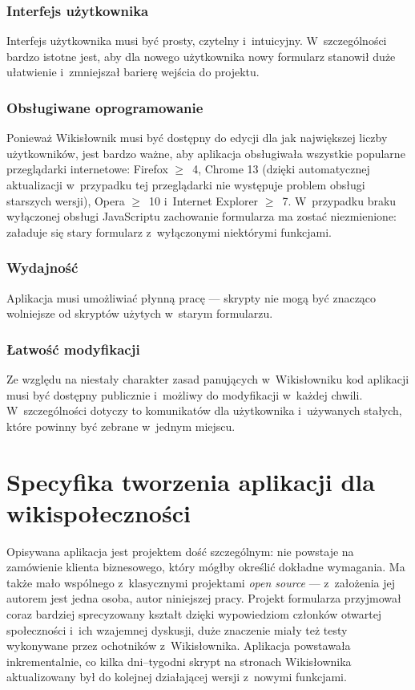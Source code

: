 \subsubsection{Interfejs użytkownika}
Interfejs użytkownika musi być prosty, czytelny i~intuicyjny. W~szczególności bardzo istotne jest, aby dla nowego użytkownika nowy formularz stanowił duże ułatwienie i~zmniejszał barierę wejścia do projektu.

\subsubsection{Obsługiwane oprogramowanie}
Ponieważ Wikisłownik musi być dostępny do edycji dla jak największej liczby użytkowników, jest bardzo ważne, aby aplikacja obsługiwała wszystkie popularne przeglądarki internetowe: Firefox $\geq$~4, Chrome 13 (dzięki automatycznej aktualizacji w~przypadku tej przeglądarki nie występuje problem obsługi starszych wersji), Opera $\geq$~10 i~Internet Explorer $\geq$~7. W~przypadku braku wyłączonej obsługi JavaScriptu zachowanie formularza ma zostać niezmienione: załaduje się stary formularz z~wyłączonymi niektórymi funkcjami.

\subsubsection{Wydajność}
Aplikacja musi umożliwiać płynną pracę --- skrypty nie mogą być znacząco wolniejsze od skryptów użytych w~starym formularzu.

\subsubsection{Łatwość modyfikacji}
Ze względu na niestały charakter zasad panujących w~Wikisłowniku kod aplikacji musi być dostępny publicznie i~możliwy do modyfikacji w~każdej chwili. W~szczególności dotyczy to komunikatów dla użytkownika i~używanych stałych, które powinny być zebrane w~jednym miejscu.

\section{Specyfika tworzenia aplikacji dla wikispołeczności}
\label{sec:spec}
Opisywana aplikacja jest projektem dość szczególnym: nie powstaje na zamówienie klienta biznesowego, który mógłby określić dokładne wymagania. Ma także mało wspólnego z~klasycznymi projektami \emph{open source} --- z~założenia jej autorem jest jedna osoba, autor niniejszej pracy. Projekt formularza przyjmował coraz bardziej sprecyzowany kształt dzięki wypowiedziom członków otwartej społeczności i~ich wzajemnej dyskusji, duże znaczenie miały też testy wykonywane przez ochotników z~Wikisłownika. Aplikacja powstawała inkrementalnie, co kilka dni--tygodni skrypt na stronach Wikisłownika aktualizowany był do kolejnej działającej wersji z~nowymi funkcjami.

